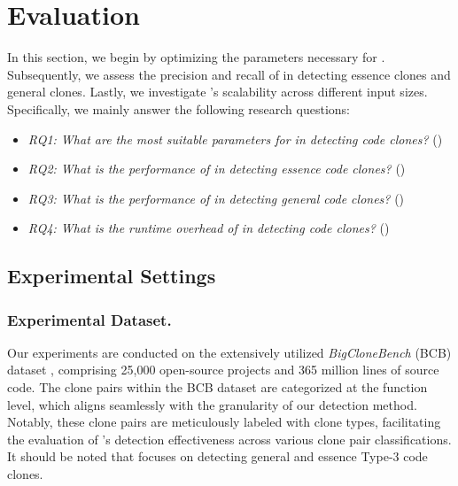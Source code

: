 \section{Evaluation}
In this section, 
we begin by optimizing the parameters necessary for \toolname. 
Subsequently, we assess the precision and recall of \toolname in detecting essence clones and general clones. 
Lastly, we investigate \toolname's scalability across different input sizes. 
Specifically, we mainly answer the following research questions:
\begin{itemize}
    \item \emph{RQ1: What are the most suitable parameters for \toolname in detecting code clones?} ()
    \item \emph{RQ2: What is the performance of \toolname in detecting essence code clones?} ()
    \item \emph{RQ3: What is the performance of \toolname in detecting general code clones?} ()
    \item \emph{RQ4: What is the runtime overhead of \toolname in detecting code clones?} ()
\end{itemize}

\subsection{Experimental Settings}

\subsubsection{Experimental Dataset.} \label{section:dataset}

Our experiments are conducted on the extensively utilized \emph{BigCloneBench} (BCB) dataset \cite{big,svajlenko2014big}, comprising 25,000 open-source projects and 365 million lines of source code. 
The clone pairs within the BCB dataset are categorized at the function level, which aligns seamlessly with the granularity of our detection method. 
Notably, these clone pairs are meticulously labeled with clone types, facilitating the evaluation of \toolname's detection effectiveness across various clone pair classifications. 
It should be noted that \emph{\toolname} focuses on detecting general and essence Type-3 code clones.

